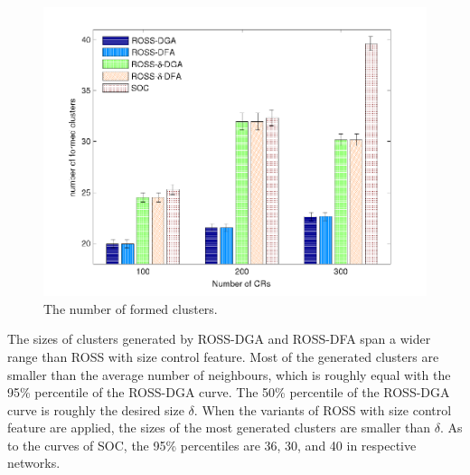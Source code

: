 \documentclass[10pt,journal,compsoc]{IEEEtran}
\theoremstyle{mytheoremstyle}
\theoremstyle{mytheoremstyle}
\theoremstyle{mytheoremstyle}
\begin{document}
\begin{figure}[!h]
  \centering
   \includegraphics[width=0.7\linewidth]{nClusters_largeNetwork.pdf}
  \caption{The number of formed clusters.}
  \label{nClusters_largeNetwork}
\end{figure}






The sizes of clusters generated by ROSS-DGA and ROSS-DFA span a wider range than ROSS with size control feature.
Most of the generated clusters are smaller than the average number of neighbours, which is roughly equal with the 95\% percentile of the ROSS-DGA curve.
The 50\% percentile of the ROSS-DGA curve is roughly the desired size $\delta$.
%
When the variants of ROSS with size control feature are applied, the sizes of the most generated clusters are smaller than $\delta$.
As to the curves of SOC, the 95\% percentiles are 36, 30, and 40 in respective networks.
\end{document}
